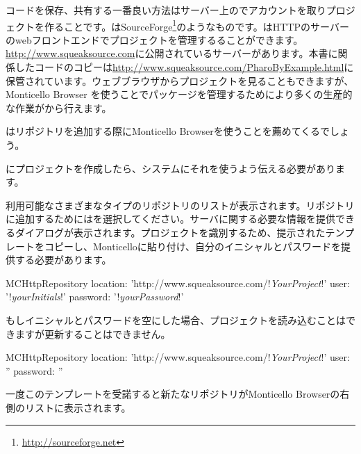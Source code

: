 \documentclass[a4paper,10pt,twoside]{book}
\begin{document}
コードを保存、共有する一番良い方法は\sqsrc サーバー上のでアカウントを取りプロジェクトを作ることです。\sqsrc はSourceForge\footnote{\url{http://sourceforge.net}}のようなものです。\sqsrc はHTTPのサーバーのwebフロントエンドでプロジェクトを管理するることができます。
\url{http://www.squeaksource.com}に公開されている\sqsrc サーバーがあります。本書に関係したコードのコピーは\url{http://www.squeaksource.com/PharoByExample.html}に保管されています。ウェブブラウザからプロジェクトを見ることもできますが、Monticello Browser を使うことでパッケージを管理するためにより多くの生産的な作業が\pharo から行えます。


\sqsrc はリポジトリを追加する際にMonticello Browserを使うことを薦めてくるでしょう。

\sqsrc にプロジェクトを作成したら、\pharo システムにそれを使うよう伝える必要があります。

利用可能なさまざまなタイプのリポジトリのリストが表示されます。\sqsrc リポジトリに追加するためにはを選択してください。サーバに関する必要な情報を提供できるダイアログが表示されます。\sqsrc プロジェクトを識別するため、提示されたテンプレートをコピーし、Monticelloに貼り付け、自分のイニシャルとパスワードを提供する必要があります。

\begin{code}{}
MCHttpRepository
    location: 'http://www.squeaksource.com/!\emph{YourProject}!'
    user: '!\emph{yourInitials}!'
    password: '!\emph{yourPassword}!'
\end{code}

\noindent
もしイニシャルとパスワードを空にした場合、プロジェクトを読み込むことはできますが更新することはできません。

\begin{code}{}
MCHttpRepository
    location: 'http://www.squeaksource.com/!\emph{YourProject}!'
    user: ''
    password: ''
\end{code}

一度このテンプレートを受諾すると新たなリポジトリがMonticello Browserの右側のリストに表示されます。
\end{document}
